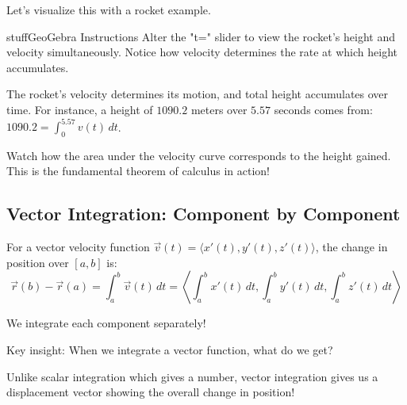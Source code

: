 \documentclass{ximera}
\begin{document}
\begin{problem}
Let's visualize this with a rocket example.

\begin{expandable}{stuff}{GeoGebra Instructions}
    Alter the "t=" slider to view the rocket's height and velocity simultaneously. Notice how velocity determines the rate at which height accumulates.
\end{expandable}

\begin{center}
\end{center}

The rocket's velocity determines its motion, and total height accumulates over time. For instance, a height of $1090.2$ meters over $5.57$ seconds comes from: $1090.2 = \int_0^{5.57} v(t) \, dt$.

\begin{feedback}
Watch how the area under the velocity curve corresponds to the height gained. This is the fundamental theorem of calculus in action!
\end{feedback}
\end{problem}

\subsection*{Vector Integration: Component by Component}

\begin{definition}
For a vector velocity function $\vec{v}(t)=\langle x'(t), y'(t), z'(t)\rangle$, the change in position over $[a,b]$ is:
$$\vec{r}(b)-\vec{r}(a)= \int_a^b \vec{v}(t)\, dt=\left\langle \int_a^b x'(t)\, dt, \int_a^b y'(t)\, dt, \int_a^b z'(t)\, dt\right\rangle$$

We integrate each component separately!
\end{definition}

\begin{problem}
Key insight: When we integrate a vector function, what do we get?

\begin{multipleChoice}
\end{multipleChoice}

\begin{feedback}
Unlike scalar integration which gives a number, vector integration gives us a displacement vector showing the overall change in position!
\end{feedback}
\end{problem}
\end{document}
